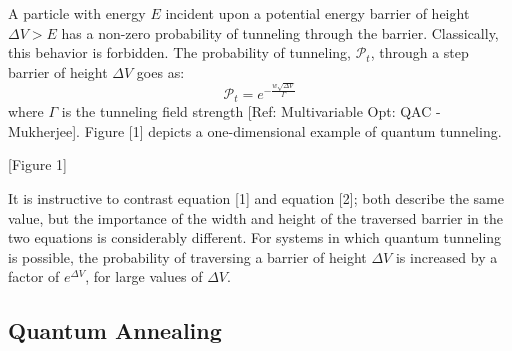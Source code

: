 \documentclass[11pt]{afthesis}
\begin{document}
A particle with energy \begin{math} E \end{math} incident upon a potential energy barrier of height \begin{math} \Delta V > E  \end{math} has a non-zero probability of tunneling through the barrier. Classically, this behavior is forbidden. The probability of tunneling, \begin{math} \mathcal{P}_t \end{math}, through a step barrier of height \begin{math} \Delta V  \end{math} goes as: 
\begin{equation}
\mathcal{P}_t = e^{-\frac{w \sqrt{\Delta V}}{ \Gamma}} 
\end{equation} where \begin{math} \Gamma \end{math} is the tunneling field strength [Ref: Multivariable Opt: QAC - Mukherjee]. Figure [1] depicts a one-dimensional example of quantum tunneling.


[Figure 1] 

It is instructive to contrast equation [1] and equation [2]; both describe the same value, but the importance of the width and height of the traversed barrier in the two equations is considerably different. For systems in which quantum tunneling is possible, the probability of traversing a barrier of height \begin{math} \Delta V \end{math} is increased by a factor of \begin{math} e^{\Delta V} \end{math}, for large values of \begin{math} \Delta V \end{math}.

\subsection{Quantum Annealing}
\end{document}
